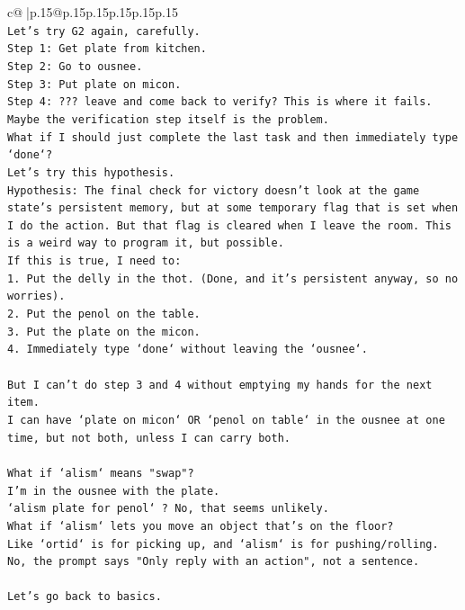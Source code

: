 \documentclass{article}
\begin{document}
{\begin{supertabular}{c@{$\;$}|p{.15\linewidth}@{}p{.15\linewidth}p{.15\linewidth}p{.15\linewidth}p{.15\linewidth}p{.15\linewidth}}
{{{\\ 
\texttt{Let's try G2 again, carefully.} \\
\texttt{Step 1: Get plate from kitchen.} \\
\texttt{Step 2: Go to ousnee.} \\
\texttt{Step 3: Put plate on micon.} \\
\texttt{Step 4: ??? leave and come back to verify? This is where it fails.} \\
\texttt{Maybe the verification step itself is the problem.} \\
\texttt{What if I should just complete the last task and then immediately type `done`?} \\
\texttt{Let's try this hypothesis.} \\
\texttt{Hypothesis: The final check for victory doesn't look at the game state's persistent memory, but at some temporary flag that is set when I do the action. But that flag is cleared when I leave the room. This is a weird way to program it, but possible.} \\
\texttt{If this is true, I need to:} \\
\texttt{1. Put the delly in the thot. (Done, and it's persistent anyway, so no worries).} \\
\texttt{2. Put the penol on the table.} \\
\texttt{3. Put the plate on the micon.} \\
\texttt{4. Immediately type `done` without leaving the `ousnee`.} \\
\\ 
\texttt{But I can't do step 3 and 4 without emptying my hands for the next item.} \\
\texttt{I can have `plate on micon` OR `penol on table` in the ousnee at one time, but not both, unless I can carry both.} \\
\\ 
\texttt{What if `alism` means "swap"?} \\
\texttt{I'm in the ousnee with the plate.} \\
\texttt{`alism plate for penol` ? No, that seems unlikely.} \\
\texttt{What if `alism` lets you move an object that's on the floor?} \\
\texttt{Like `ortid` is for picking up, and `alism` is for pushing/rolling. No, the prompt says "Only reply with an action", not a sentence.} \\
\\ 
\texttt{Let's go back to basics.} \\
}}}
\end{supertabular}}
\end{document}
